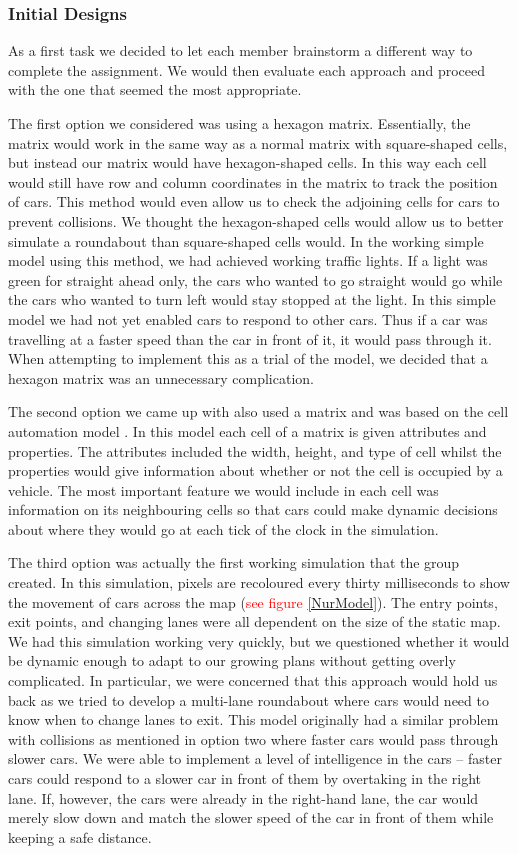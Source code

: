 \documentclass{article}
\begin{document}
\subsubsection{Initial Designs}
As a first task we decided to let each member brainstorm a different way to complete the assignment. We would then evaluate each approach and proceed with the one that seemed the most appropriate.


	The first option we considered was using a hexagon matrix. Essentially, the matrix would work in the same way as a normal matrix with square-shaped cells, but instead our matrix would have hexagon-shaped cells. In this way each cell would still have row and column coordinates in the matrix to track the position of cars. This method would even allow us to check the adjoining cells for cars to prevent collisions. We thought the hexagon-shaped cells would allow us to better simulate a roundabout than square-shaped cells would. In the working simple model using this method, we had achieved working traffic lights. If a light was green for straight ahead only, the cars who wanted to go straight would go while the cars who wanted to turn left would stay stopped at the light. In this simple model we had not yet enabled cars to respond to other cars. Thus if a car was travelling at a faster speed than the car in front of it, it would pass through it. When attempting to implement this as a trial of the model, we decided that a hexagon matrix was an unnecessary complication.
    
    The second option we came up with also used a matrix and was based on the cell automation model \cite{namekawa2005general}. In this model each cell of a matrix is given attributes and properties. The attributes included the width, height, and type of cell whilst the properties would give information about whether or not the cell is occupied by a vehicle. The most important feature we would include in each cell was information on its neighbouring cells so that cars could make dynamic decisions about where they would go at each tick of the clock in the simulation.
    
    The third option was actually the first working simulation that the group created. In this simulation, pixels are recoloured every thirty milliseconds to show the movement of cars across the map (\textcolor{red}{see figure \ref{NurModel}}). The entry points, exit points, and changing lanes were all dependent on the size of the static map. We had this simulation working very quickly, but we questioned whether it would be dynamic enough to adapt to our growing plans without getting overly complicated. In particular, we were concerned that this approach would hold us back as we tried to develop a multi-lane roundabout where cars would need to know when to change lanes to exit. This model originally had a similar problem with collisions as mentioned in option two where faster cars would pass through slower cars. We were able to implement a level of intelligence in the cars -- faster cars could respond to a slower car in front of them by overtaking in the right lane. If, however, the cars were already in the right-hand lane, the car would merely slow down and match the slower speed of the car in front of them while keeping a safe distance.
    
\end{document}
